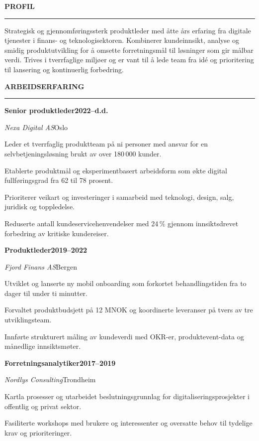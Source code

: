 \documentclass[10pt,a4paper]{article}
\newcommand{\cvsection}[2]{%
  \vspace{3.5pt}%
  {\large\bfseries\color{navy}#1\hspace{5pt}\MakeUppercase{#2}}\par
  \vspace{1pt}%
  {\color{coral}\rule{\linewidth}{1.1pt}}\par
  \vspace{3pt}%
}
\newcommand{\roleentry}[4]{%
  \textbf{#1}\hfill{\small\bfseries\color{fjord}#2}\par
  {\small\itshape #3}\hfill{\small\color{muted}#4}\par
}
\begin{document}
\begin{minipage}[t]{0.665\textwidth}
  \vspace{0pt}
  \RaggedRight

  \cvsection{\faUser}{Profil}
  \normalsize
  Strategisk og gjennomføringssterk produktleder med åtte års erfaring fra digitale
  tjenester i finans- og teknologisektoren. Kombinerer kundeinnsikt, analyse og smidig
  produktutvikling for å omsette forretningsmål til løsninger som gir målbar verdi.
  Trives i tverrfaglige miljøer og er vant til å lede team fra idé og prioritering til
  lansering og kontinuerlig forbedring.

  \cvsection{\faBriefcase}{Arbeidserfaring}

  \roleentry{Senior produktleder}{2022--d.d.}{Nexa Digital AS}{Oslo}
  \begin{achievementlist}
    \item Leder et tverrfaglig produktteam på ni personer med ansvar for en selvbetjeningsløsning brukt av over 180\,000 kunder.
    \item Etablerte produktmål og eksperimentbasert arbeidsform som økte digital fullføringsgrad fra 62 til 78 prosent.
    \item Prioriterer veikart og investeringer i samarbeid med teknologi, design, salg, juridisk og toppledelse.
    \item Reduserte antall kundeservicehenvendelser med 24\,\% gjennom innsiktsdrevet forbedring av kritiske kundereiser.
  \end{achievementlist}

  \vspace{3pt}
  \roleentry{Produktleder}{2019--2022}{Fjord Finans AS}{Bergen}
  \begin{achievementlist}
    \item Utviklet og lanserte ny mobil onboarding som forkortet behandlingstiden fra to dager til under ti minutter.
    \item Forvaltet produktbudsjett på 12 MNOK og koordinerte leveranser på tvers av tre utviklingsteam.
    \item Innførte strukturert måling av kundeverdi med OKR-er, produktevent-data og månedlige innsiktsmøter.
  \end{achievementlist}

  \vspace{3pt}
  \roleentry{Forretningsanalytiker}{2017--2019}{Nordlys Consulting}{Trondheim}
  \begin{achievementlist}
    \item Kartla prosesser og utarbeidet beslutningsgrunnlag for digitaliseringsprosjekter i offentlig og privat sektor.
    \item Fasiliterte workshops med brukere og interessenter og oversatte behov til tydelige krav og prioriteringer.
  \end{achievementlist}


\end{minipage}
\end{document}
